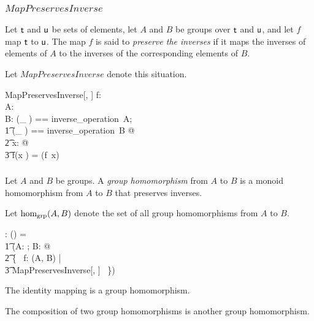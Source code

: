 \documentclass[11pt, oneside]{article}
\begin{document}
\subsubsection{$MapPreservesInverse$}

Let $\mathsf{t}$ and $\mathsf{u}$ be sets of elements,
let $A$ and $B$ be groups over $\mathsf{t}$ and $\mathsf{u}$, 
and let $f$ map $\mathsf{t}$ to $\mathsf{u}$.
The map $f$ is said to {\em preserve the inverses} if it maps the inverses of elements of $A$
to the inverses of the corresponding elements of $B$.

Let $MapPreservesInverse$ denote this situation.

\begin{schema}{MapPreservesInverse}[\genT, \genU]
f: \genT \fun \genU \\
A: \group \genT \\
B: \group \genU
\where
\LET (\_ \invG) == inverse\_operation~A; \\
\t1	(\_ \daggerG) == inverse\_operation~B @ \\
\t2		\forall x: \genT @ \\
\t3			f(x \invG) = (f~x) \daggerG
\end{schema}

\subsubsection{}

Let $A$ and $B$ be groups.
A {\em group homomorphism} from $A$ to $B$ is a monoid homomorphism
from $A$ to $B$ that preserves inverses.

Let $\operatorname{hom_{grp}}(A, B)$ denote the set of all group homomorphisms from $A$ to $B$.

\begin{gendef}[\genT, \genU]
\homGroup: \group \genT \cross \group \genU \fun \power (\genT \fun \genU)
\where
\homGroup = \\
\t1	(\lambda A: \group \genT; B: \group \genU @ \\
\t2		\{~ f: \homMonoid(A, B) | \\
\t3			MapPreservesInverse[\genT, \genU] ~\})
\end{gendef}

\begin{remark}
The identity mapping is a group homomorphism.
\end{remark}

\begin{remark}
The composition of two group homomorphisms is another group homomorphism.
\end{remark}
\end{document}
